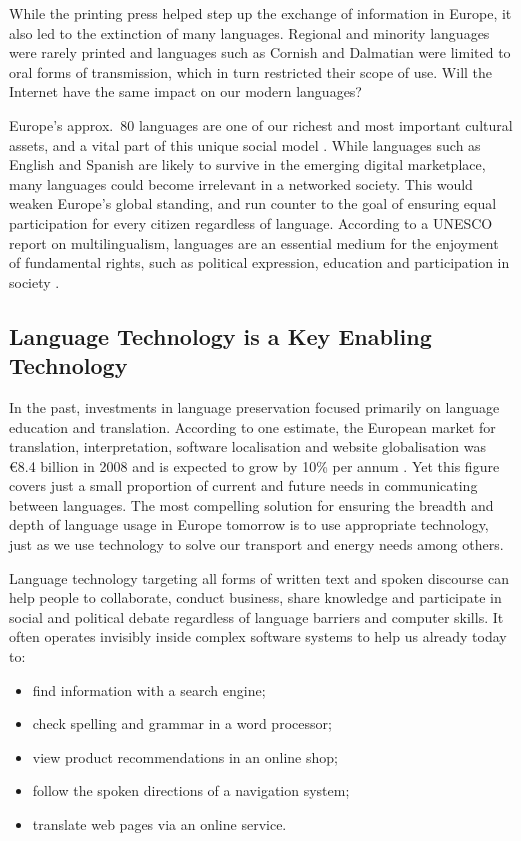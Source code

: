 \begin{multicols}{2}
While the printing press helped step up the exchange of information in Europe, it also led to the extinction of many languages. Regional and minority languages were rarely printed and languages such as Cornish and Dalmatian were limited to oral forms of transmission, which in turn restricted their scope of use. Will the Internet have the same impact on our modern languages?


Europe’s approx.~80 languages are one of our richest and most important cultural assets, and a vital part of this unique social model \cite{EC2}. While languages such as English and Spanish are likely to survive in the emerging digital marketplace, many languages could become irrelevant in a networked society. This would weaken Europe’s global standing, and run counter to the goal of ensuring equal participation for every citizen regardless of language. According to a UNESCO report on multilingualism, languages are an essential medium for the enjoyment of fundamental rights, such as political expression, education and participation in society \cite{Unesco1}.

\subsection{Language Technology is a Key Enabling Technology}

In the past, investments in language preservation focused primarily on language education and translation. According to one estimate, the European market for translation, interpretation, software localisation and website globalisation was €8.4 billion in 2008 and is expected to grow by 10\% per annum \cite{EC3}. Yet this figure covers just a small proportion of current and future needs in communicating between languages. The most compelling solution for ensuring the breadth and depth of language usage in Europe tomorrow is to use appropriate technology, just as we use technology to solve our transport and energy needs among others.

Language technology targeting all forms of written text and spoken discourse can help people to collaborate, conduct business, share knowledge and participate in social and political debate regardless of language barriers and computer skills. It often operates invisibly inside complex software systems to help us already today to:

\begin{itemize}
\item find information with a search engine;
\item check spelling and grammar in a word processor;
\item view product recommendations in an online shop;
\item follow the spoken directions of a navigation system;
\item translate web pages via an online service.
\end{itemize}


\end{multicols}
